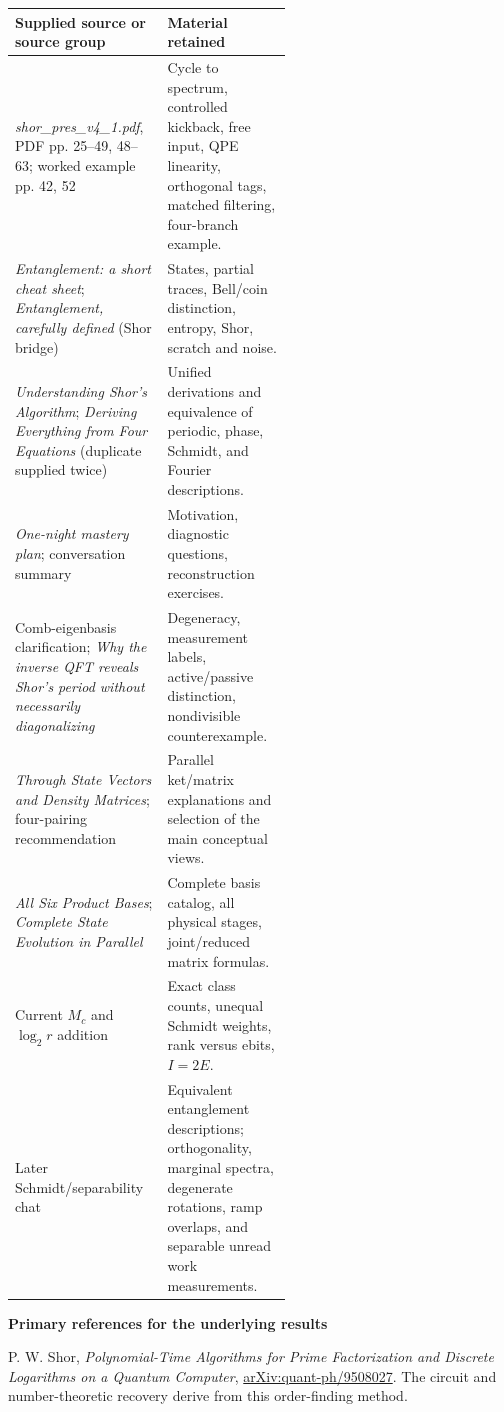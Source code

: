 \documentclass[11pt,a4paper]{article}
\newcommand{\lead}[1]{\par\vspace{3pt}\textbf{\color{ink}#1}\par}
\begin{document}
\begingroup\fontsize{9}{11.2}\selectfont
\begin{tabularx}{\linewidth}{@{}>{\raggedright\arraybackslash}p{0.55\linewidth}>{\raggedright\arraybackslash}X@{}}
\toprule
Supplied source or source group&Material retained\\
\midrule
\emph{shor\_pres\_v4\_1.pdf}, PDF pp. 25--49, 48--63; worked example pp. 42, 52&Cycle to spectrum, controlled kickback, free input, QPE linearity, orthogonal tags, matched filtering, four-branch example.\\
\emph{Entanglement: a short cheat sheet}; \emph{Entanglement, carefully defined} (Shor bridge)&States, partial traces, Bell/coin distinction, entropy, Shor, scratch and noise.\\
\emph{Understanding Shor's Algorithm}; \emph{Deriving Everything from Four Equations} (duplicate supplied twice)&Unified derivations and equivalence of periodic, phase, Schmidt, and Fourier descriptions.\\
\emph{One-night mastery plan}; conversation summary&Motivation, diagnostic questions, reconstruction exercises.\\
Comb-eigenbasis clarification; \emph{Why the inverse QFT reveals Shor's period without necessarily diagonalizing}&Degeneracy, measurement labels, active/passive distinction, nondivisible counterexample.\\
\emph{Through State Vectors and Density Matrices}; four-pairing recommendation&Parallel ket/matrix explanations and selection of the main conceptual views.\\
\emph{All Six Product Bases}; \emph{Complete State Evolution in Parallel}&Complete basis catalog, all physical stages, joint/reduced matrix formulas.\\
Current \(M_c\) and \(\log_2r\) addition&Exact class counts, unequal Schmidt weights, rank versus ebits, \(I=2E\).\\
Later Schmidt/separability chat&Equivalent entanglement descriptions; orthogonality, marginal spectra, degenerate rotations, ramp overlaps, and separable unread work measurements.\\
\bottomrule
\end{tabularx}
\endgroup

\lead{Primary references for the underlying results}
\begingroup\fontsize{9}{11.2}\selectfont
P. W. Shor, \emph{Polynomial-Time Algorithms for Prime Factorization and Discrete Logarithms on a Quantum Computer}, \href{https://arxiv.org/abs/quant-ph/9508027}{arXiv:quant-ph/9508027}. The circuit and number-theoretic recovery derive from this order-finding method.
\end{document}
